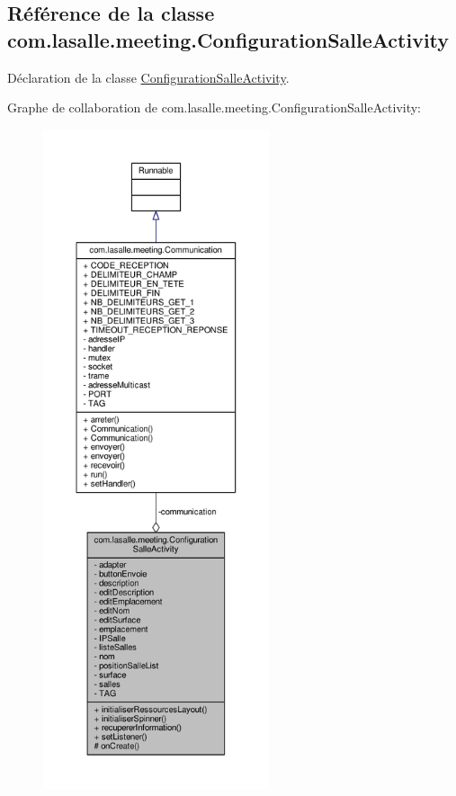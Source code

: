\hypertarget{classcom_1_1lasalle_1_1meeting_1_1_configuration_salle_activity}{}\subsection{Référence de la classe com.\+lasalle.\+meeting.\+Configuration\+Salle\+Activity}
\label{classcom_1_1lasalle_1_1meeting_1_1_configuration_salle_activity}


Déclaration de la classe \hyperlink{classcom_1_1lasalle_1_1meeting_1_1_configuration_salle_activity}{Configuration\+Salle\+Activity}.  




Graphe de collaboration de com.\+lasalle.\+meeting.\+Configuration\+Salle\+Activity\+:
\nopagebreak
\begin{figure}[H]
\begin{center}
\leavevmode
\includegraphics[height=550pt]{classcom_1_1lasalle_1_1meeting_1_1_configuration_salle_activity__coll__graph}
\end{center}
\end{figure}

